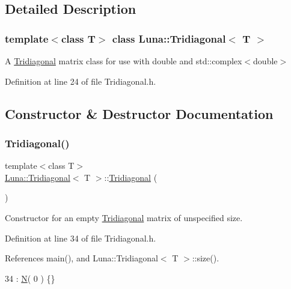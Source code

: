 \subsection{Detailed Description}
\subsubsection*{template$<$class T$>$\newline
class Luna\+::\+Tridiagonal$<$ T $>$}

A \hyperlink{classLuna_1_1Tridiagonal}{Tridiagonal} matrix class for use with double and std\+::complex$<$double$>$ 

Definition at line 24 of file Tridiagonal.\+h.



\subsection{Constructor \& Destructor Documentation}
\mbox{\label{classLuna_1_1Tridiagonal_a749d1915ad40623c14046c690c6f16af}} 
\subsubsection{\texorpdfstring{Tridiagonal()}{Tridiagonal()}\hspace{0.1cm}{\footnotesize\ttfamily [1/4]}}
{\footnotesize\ttfamily template$<$class T$>$ \\
\hyperlink{classLuna_1_1Tridiagonal}{Luna\+::\+Tridiagonal}$<$ T $>$\+::\hyperlink{classLuna_1_1Tridiagonal}{Tridiagonal} (\begin{DoxyParamCaption}{ }\end{DoxyParamCaption})\hspace{0.3cm}{\ttfamily [inline]}}



Constructor for an empty \hyperlink{classLuna_1_1Tridiagonal}{Tridiagonal} matrix of unspecified size. 



Definition at line 34 of file Tridiagonal.\+h.



References main(), and Luna\+::\+Tridiagonal$<$ T $>$\+::size().


\begin{DoxyCode}
34 : \hyperlink{namespaceHeat__plot_a7d050092798e28458a263710837bda77}{N}( 0 ) \{\}
\end{DoxyCode}
\mbox{\label{classLuna_1_1Tridiagonal_a34075ccfbb407b9f29e9f867813d1958}} 
